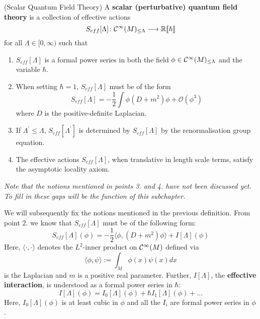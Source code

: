 \begin{definition}(Scalar Quantum Field Theory)
\label{def:scalar_qft}
  A \textbf{scalar (perturbative) quantum field theory} is a collection of effective actions
  \begin{equation}S_{eff}[\Lambda]\colon \mathcal{C}^{\infty}(M)_{\leq \Lambda} \longrightarrow \mathbb{R}\llbracket \hbar \rrbracket\end{equation}
  for all $\Lambda \in [0,\infty)$ such that
  \begin{enumerate}
    \item $S_{eff}[\Lambda]$ is a formal power series in both the field $\phi \in \Ci(M)_{\leq \Lambda}$ and the variable $\hbar$.

    \item When setting $\hbar = 1$, $S_{eff}[\Lambda]$ must be of the form
    \begin{equation}S_{eff}[\Lambda] = - \frac{1}{2} \int \phi (D + m^2) \phi + \mathcal{O}(\phi^3)\end{equation}
    where $D$ is the positive-definite Laplacian.

    \item If $\Lambda^\prime \leq \Lambda$, $S_{eff}[\Lambda^\prime]$ is determined by $S_{eff}[\Lambda]$ by the renormalisation group equation.

    \item The effective actions $S_{eff}[\Lambda]$, when translative in length scale terms, satisfy the asymptotic locality axiom.
  \end{enumerate}
  \emph{Note that the notions mentioned in points 3. and 4. have not been discussed yet. To fill in these gaps will be the function of this subchapter.}
\end{definition}

We will subsequently fix the notions mentioned in the previous definition. From point $2.$ we know that $S_{eff}[\Lambda]$ must be of the following form:
\begin{equation}S_{eff}[\Lambda](\phi) = - \frac{1}{2} \langle \phi, (D+m^2)\phi \rangle + I[\Lambda](\phi)\end{equation}
Here, $\langle \cdot , \cdot \rangle$ denotes the $L^2$-inner product on $\mathcal{C}^{\infty}(M)$ defined via
\begin{equation}
  \langle \phi , \psi \rangle := \int_M \phi(x) \psi(x) dx
\end{equation}
is the Laplacian and $m$ is a positive real parameter. Further, $I[\Lambda]$, the \textbf{effective interaction}, is understood as a formal power series in $\hbar$:
\begin{equation} I[\Lambda](\phi) = I_0[\Lambda](\phi) + \hbar I_1[\Lambda](\phi) + ...\end{equation}
Here, $I_0[\Lambda](\phi)$ is at least cubic in $\phi$ and all the $I_i$ are formal power series in $\phi$.\\

